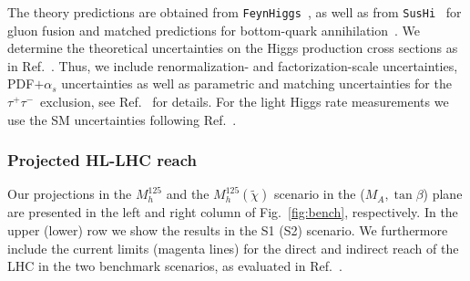 \documentclass[../report.tex]{subfiles}
\begin{document}
The theory predictions are obtained from
\texttt{FeynHiggs}~\cite{Heinemeyer:1998yj,Heinemeyer:1998np,Degrassi:2002fi,Frank:2006yh,Hahn:2013ria,Bahl:2016brp,Bahl:2017aev,FH214},
as well as from \texttt{SusHi}~\cite{Harlander:2012pb, Harlander:2016hcx,
Harlander:2005rq,Harlander:2002wh,
Harlander:2002vv,Anastasiou:2014lda,Anastasiou:2015yha,
Anastasiou:2016cez,Degrassi:2010eu, Degrassi:2011vq,
Degrassi:2012vt,Actis:2008ug}
for gluon fusion and matched predictions for bottom-quark
annihilation~\cite{Bonvini:2015pxa,Bonvini:2016fgf,Forte:2015hba, Forte:2016sja}. We determine the theoretical uncertainties on the Higgs production cross sections as in Ref.~\cite{Bahl:2018zmf}. Thus, we include renormalization- and factorization-scale uncertainties, PDF$+\alpha_s$ uncertainties as well as parametric and matching uncertainties for the $\tau^+\tau^-$~exclusion, see Ref.~\cite{Bahl:2018zmf} for details. For the light Higgs rate measurements we use the SM uncertainties following Ref.~\cite{deFlorian:2016spz}.

\subsubsection*{Projected HL-LHC reach}
 
Our projections in the $M_h^{125}$ and the $M_h^{125}(\tilde{\chi})$ scenario in the
($M_A, \tan\beta$) plane are presented in the left and right column of Fig.~\ref{fig:bench}, respectively. In the upper (lower) row we show the results in the S1 (S2) scenario. We furthermore include the current limits (magenta lines) for the direct and indirect reach of the LHC in the two benchmark scenarios, as evaluated in Ref.~\cite{Bahl:2018zmf}.
\end{document}
